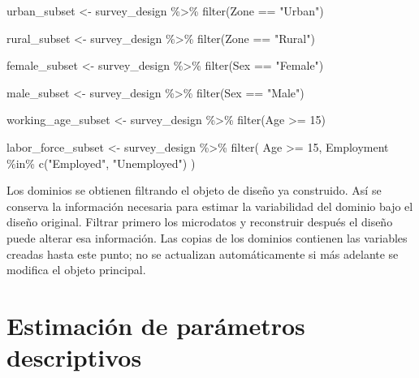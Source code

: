 \documentclass[
  spanish,
  11pt,
  letterpaper,
  oneside,
  open=any]{scrbook}
\newenvironment{Shaded}{\begin{snugshade}}{\end{snugshade}}
\newcommand{\DecValTok}[1]{\textcolor[rgb]{0.68,0.00,0.00}{#1}}
\newcommand{\FunctionTok}[1]{\textcolor[rgb]{0.28,0.35,0.67}{#1}}
\newcommand{\NormalTok}[1]{\textcolor[rgb]{0.00,0.23,0.31}{#1}}
\newcommand{\OtherTok}[1]{\textcolor[rgb]{0.00,0.23,0.31}{#1}}
\newcommand{\SpecialCharTok}[1]{\textcolor[rgb]{0.37,0.37,0.37}{#1}}
\newcommand{\StringTok}[1]{\textcolor[rgb]{0.13,0.47,0.30}{#1}}
\begin{document}
\begin{Shaded}
\begin{Highlighting}[]
\NormalTok{urban\_subset }\OtherTok{\textless{}{-}}\NormalTok{ survey\_design }\SpecialCharTok{\%\textgreater{}\%}
  \FunctionTok{filter}\NormalTok{(Zone }\SpecialCharTok{==} \StringTok{"Urban"}\NormalTok{)}

\NormalTok{rural\_subset }\OtherTok{\textless{}{-}}\NormalTok{ survey\_design }\SpecialCharTok{\%\textgreater{}\%}
  \FunctionTok{filter}\NormalTok{(Zone }\SpecialCharTok{==} \StringTok{"Rural"}\NormalTok{)}

\NormalTok{female\_subset }\OtherTok{\textless{}{-}}\NormalTok{ survey\_design }\SpecialCharTok{\%\textgreater{}\%}
  \FunctionTok{filter}\NormalTok{(Sex }\SpecialCharTok{==} \StringTok{"Female"}\NormalTok{)}

\NormalTok{male\_subset }\OtherTok{\textless{}{-}}\NormalTok{ survey\_design }\SpecialCharTok{\%\textgreater{}\%}
  \FunctionTok{filter}\NormalTok{(Sex }\SpecialCharTok{==} \StringTok{"Male"}\NormalTok{)}

\NormalTok{working\_age\_subset }\OtherTok{\textless{}{-}}\NormalTok{ survey\_design }\SpecialCharTok{\%\textgreater{}\%}
  \FunctionTok{filter}\NormalTok{(Age }\SpecialCharTok{\textgreater{}=} \DecValTok{15}\NormalTok{)}

\NormalTok{labor\_force\_subset }\OtherTok{\textless{}{-}}\NormalTok{ survey\_design }\SpecialCharTok{\%\textgreater{}\%}
  \FunctionTok{filter}\NormalTok{(}
\NormalTok{    Age }\SpecialCharTok{\textgreater{}=} \DecValTok{15}\NormalTok{,}
\NormalTok{    Employment }\SpecialCharTok{\%in\%} \FunctionTok{c}\NormalTok{(}\StringTok{"Employed"}\NormalTok{, }\StringTok{"Unemployed"}\NormalTok{)}
\NormalTok{  )}
\end{Highlighting}
\end{Shaded}

Los dominios se obtienen filtrando el objeto de diseño ya construido.
Así se conserva la información necesaria para estimar la variabilidad
del dominio bajo el diseño original. Filtrar primero los microdatos y
reconstruir después el diseño puede alterar esa información. Las copias
de los dominios contienen las variables creadas hasta este punto; no se
actualizan automáticamente si más adelante se modifica el objeto
principal.

\section{Estimación de parámetros
descriptivos}\label{estimacion-parametros-descriptivos-categoricas}
\end{document}
